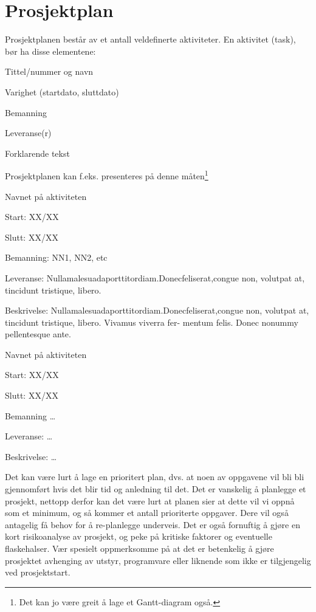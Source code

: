 \documentclass[11pt,a4paper]{report}
\begin{document}
\section*{Prosjektplan}

Prosjektplanen består av et antall veldefinerte aktiviteter. En aktivitet (task), bør ha disse elementene: 

\begin{compactitem}
\item Tittel/nummer og navn
\item Varighet (startdato, sluttdato)
\item Bemanning 
\item Leveranse(r)
\item Forklarende tekst
\end{compactitem}

Prosjektplanen kan f.eks. presenteres på denne måten\footnote{Det kan jo være greit å lage et Gantt-diagram også.}

\begin{compactdesc}
\item [Aktivitetet 1:] Navnet på aktiviteten
	\begin{compactitem}
	\item Start: XX/XX
	\item Slutt: XX/XX
	\item Bemanning: NN1, NN2, etc
	\item Leveranse: Nullamalesuadaporttitordiam.Donecfeliserat,congue
non, volutpat at, tincidunt tristique, libero. 
	\item Beskrivelse: Nullamalesuadaporttitordiam.Donecfeliserat,congue
non, volutpat at, tincidunt tristique, libero. Vivamus viverra fer- mentum felis. Donec nonummy pellentesque ante. 
	\end{compactitem}
	\item [Aktivitetet X:.] Navnet på aktiviteten
	\begin{compactitem}
	\item Start: XX/XX
	\item Slutt: XX/XX
	\item Bemanning \dots
	\item Leveranse: \dots
	\item Beskrivelse: \dots
	\end{compactitem}

\end{compactdesc}


Det kan være lurt å lage en prioritert plan, dvs. at noen av oppgavene vil bli bli gjennomført hvis det blir tid og anledning til det. Det er vanskelig å planlegge et prosjekt, nettopp derfor kan det være lurt at planen sier at dette vil vi oppnå som et minimum, og så kommer et antall prioriterte oppgaver. Dere vil også antagelig få behov for å re-planlegge underveis.  Det er også fornuftig å gjøre en kort risikoanalyse av prosjekt, og peke på kritiske faktorer og eventuelle flaskehalser. Vær spesielt oppmerksomme på at det er betenkelig å gjøre prosjektet avhenging av utstyr, programvare eller liknende som ikke er tilgjengelig ved prosjektstart.
\end{document}
